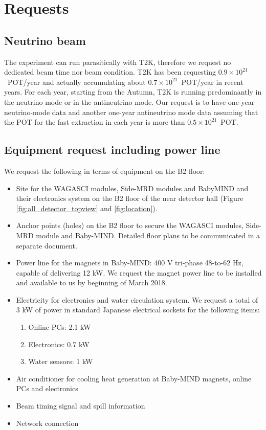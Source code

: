 \section{Requests}

\subsection{Neutrino beam}
The experiment can run parasitically with T2K, therefore we request no dedicated beam time nor beam condition.
T2K has been requesting
$0.9\times10^{21}$~POT/year and actually accumulating about $0.7\times10^{21}$~POT/year in recent years.
For each year, starting from the Autumn,  T2K is running predominantly in the neutrino mode or in the antineutrino mode.
Our request is to have one-year neutrino-mode data and another one-year antineutrino mode data
assuming that the POT for the fast extraction in each year is more than $0.5\times10^{21}$~POT.

\subsection{Equipment request including power line}
We request the following
in terms of equipment on the B2 floor:
\begin{itemize}
\item {Site for the WAGASCI modules, Side-MRD modules and BabyMIND and their electronics system on the B2 floor of the near detector hall (Figure \ref{fig:all_detector_topview} and \ref{fig:location}).}
\item {Anchor points (holes) on the B2 floor to secure the WAGASCI modules, Side-MRD module and Baby-MIND. Detailed floor plans to be communicated in a separate document.}
\item {Power line for the magnets in Baby-MIND: 400 V tri-phase 48-to-62 Hz, capable of delivering 12 kW. 
We request the magnet power line
to be installed and available to us by beginning of March 2018.}
\item Electricity for electronics and 
water circulation system. We request a total of 3 kW of power in standard Japanese electrical sockets for the following items:
	\begin{enumerate}
		\item Online PCs: 2.1 kW
		\item Electronics: 0.7 kW
		\item Water sensors: 1 kW
	\end{enumerate}
\item Air conditioner for cooling heat generation at Baby-MIND magnets, online PCs and electronics
\item Beam timing signal and spill information
\item Network connection
\end{itemize}

